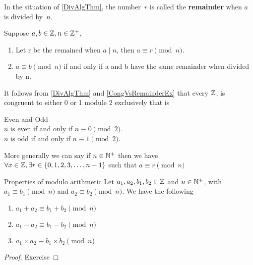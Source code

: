 \documentclass[../MATH-2000-Notes.tex]{subfiles}
\begin{document}
\begin{Definition}
    {}
    In the situation of \ref{DivAlgThm}, the number~$r$ is called the \textbf{remainder} when $a$ is divided by~$n$.
\end{Definition}
\begin{Proposition}
    {} \label{CongVsRemainderEx}
    Suppose \(a,b \in \mathbb{Z}, n\in \mathbb{Z}^+\),
    \begin{enumerate}
        \item Let r be the remained when \(a \mid n\), then \(a \equiv r \pmod n\).
        \item \(a \equiv b \pmod n\) if and only if a and b have the same remainder when divided by n.
    \end{enumerate}
\end{Proposition}
It follows from \ref{DivAlgThm} and \ref{CongVsRemainderEx} that every \(\mathbb{Z}\), is congruent to either 0 or 1 module 2 exclusively that is
\begin{paperbox}{Even and Odd}\label{0or1Mod2}~\\
    $n$ is even if and only if $n \equiv 0 \pmod{2}$.
    \\[5pt] $n$ is odd if and only if $n \equiv 1 \pmod{2}$.
\end{paperbox}
More generally we can say if \(n \in \mathbb{N}^+\) then we have \(\forall x \in \mathbb{Z}, \exists r\in \{0,1,2,3,\dots,n-1\}\) such that \(a \equiv r \pmod n\)

\begin{Theorem}
    {Properties of modulo arithmetic}
    Let \(a_1,a_2,b_1,b_2 \in \mathbb{Z}\) and \(n \in \mathbb{N}^+\), with \(a_1 \equiv b_1 \pmod n\) and \(a_2 \equiv b_2 \pmod n\). We have the following
    \begin{enumerate}
        \item \(a_1 + a_2 \equiv b_1 + b_2 \pmod n\)
        \item \(a_1 - a_2 \equiv b_1 - b_2 \pmod n\)
        \item \(a_1 \times a_2 \equiv b_1 \times b_2 \pmod n\)
    \end{enumerate}
\end{Theorem}

\begin{proof}
    Exercise
\end{proof}
\end{document}
